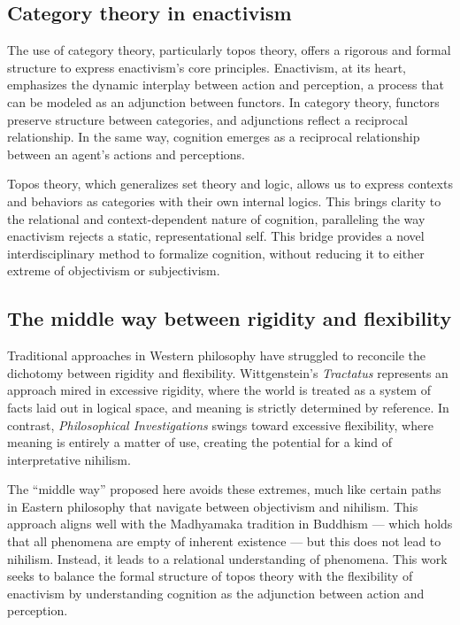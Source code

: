 \documentclass{article}
\begin{document}
\subsection{Category theory in enactivism}
The use of category theory, particularly topos theory, offers a rigorous and formal structure to express enactivism's core principles. Enactivism, at its heart, emphasizes the dynamic interplay between action and perception, a process that can be modeled as an adjunction between functors. In category theory, functors preserve structure between categories, and adjunctions reflect a reciprocal relationship. In the same way, cognition emerges as a reciprocal relationship between an agent's actions and perceptions.

Topos theory, which generalizes set theory and logic, allows us to express contexts and behaviors as categories with their own internal logics. This brings clarity to the relational and context-dependent nature of cognition, paralleling the way enactivism rejects a static, representational self. This bridge provides a novel interdisciplinary method to formalize cognition, without reducing it to either extreme of objectivism or subjectivism.


\subsection{The middle way between rigidity and flexibility}
Traditional approaches in Western philosophy have struggled to reconcile the dichotomy between rigidity and flexibility. Wittgenstein's \emph{Tractatus} represents an approach mired in excessive rigidity, where the world is treated as a system of facts laid out in logical space, and meaning is strictly determined by reference. In contrast, \emph{Philosophical Investigations} swings toward excessive flexibility, where meaning is entirely a matter of use, creating the potential for a kind of interpretative nihilism.

The ``middle way'' proposed here avoids these extremes, much like certain paths in Eastern philosophy that navigate between objectivism and nihilism. This approach aligns well with the Madhyamaka tradition in Buddhism --- which holds that all phenomena are empty of inherent existence --- but this does not lead to nihilism. Instead, it leads to a relational understanding of phenomena. This work seeks to balance the formal structure of topos theory with the flexibility of enactivism by understanding cognition as the adjunction between action and perception.
\end{document}
